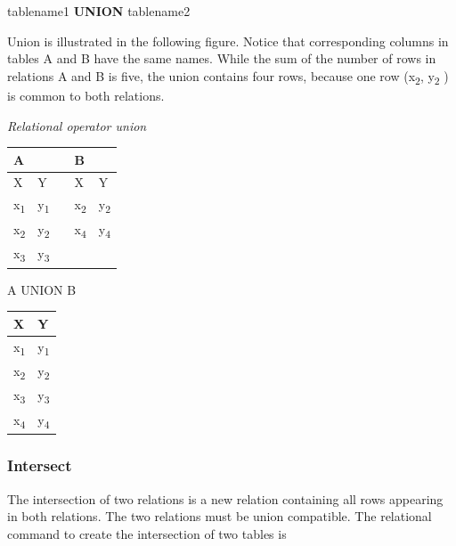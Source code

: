 \documentclass[
]{article}
\newenvironment{Shaded}{\begin{snugshade}}{\end{snugshade}}
\newcommand{\KeywordTok}[1]{\textcolor[rgb]{0.13,0.29,0.53}{\textbf{#1}}}
\newcommand{\NormalTok}[1]{#1}
\begin{document}
\begin{Shaded}
\begin{Highlighting}[]
\NormalTok{tablename1 }\KeywordTok{UNION}\NormalTok{ tablename2}
\end{Highlighting}
\end{Shaded}

Union is illustrated in the following figure. Notice that corresponding
columns in tables A and B have the same names. While the sum of the
number of rows in relations A and B is five, the union contains four
rows, because one row (x\textsubscript{2}, y\textsubscript{2} ) is common to both relations.

\emph{Relational operator union}

\begin{longtable}[]{@{}lllll@{}}
\toprule
A & & & B & \\
\midrule
\endhead
X & Y & & X & Y \\
x\textsubscript{1} & y\textsubscript{1} & & x\textsubscript{2} & y\textsubscript{2} \\
x\textsubscript{2} & y\textsubscript{2} & & x\textsubscript{4} & y\textsubscript{4} \\
x\textsubscript{3} & y\textsubscript{3} & & & \\
\bottomrule
\end{longtable}

A UNION B

\begin{longtable}[]{@{}ll@{}}
\toprule
X & Y \\
\midrule
\endhead
x\textsubscript{1} & y\textsubscript{1} \\
x\textsubscript{2} & y\textsubscript{2} \\
x\textsubscript{3} & y\textsubscript{3} \\
x\textsubscript{4} & y\textsubscript{4} \\
\bottomrule
\end{longtable}

\hypertarget{intersect}{%
\subsubsection*{Intersect}\label{intersect}}

The intersection of two relations is a new relation containing all rows
appearing in both relations. The two relations must be union compatible.
The relational command to create the intersection of two tables is
\end{document}

